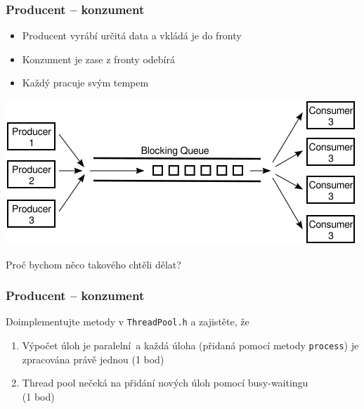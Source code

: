 \documentclass[usenames,dvipsnames,9pt]{beamer}
\begin{document}
{
  \begin{frame}
  \frametitle{Producent -- konzument}
  
  \begin{itemize}
    \item Producent vyrábí určitá data a vkládá je do fronty
    \item Konzument je zase z fronty odebírá
    \item Každý pracuje svým tempem
  \end{itemize}
  
  \vspace{1em}

  \centering\includegraphics[width=.6\linewidth]{02/figs/producer-consumer.png}

  \vspace{1em}

  \pause
  \Large \alert{Proč bychom něco takového chtěli dělat?}
  

\end{frame}

\begin{frame}
  \frametitle{Producent -- konzument}
  Doimplementujte metody v \texttt{ThreadPool.h} a zajistěte, že
  \begin{enumerate}
    \item Výpočet úloh je paralelní a každá úloha (přidaná pomocí metody \texttt{process}) je zpracována právě jednou (1 bod)
    \item Thread pool nečeká na přidání nových úloh pomocí busy-waitingu \\ 
          (1 bod)
  \end{enumerate}

\end{frame}
}

\framefeedback{}
\end{document}
